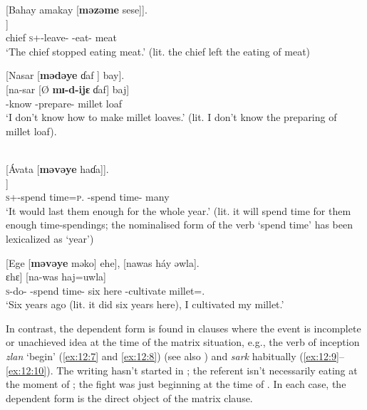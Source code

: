 \ea \label{ex:12:3}
[Bahay  amakay  [\textbf{məzəme}  sese]].\\
\gll  [bahaj   à-mak-aj   [Ø \textbf{mɪ-ʒʊm-ɛ}  ʃɛʃɛ]]\\
      chief  \textsc{s}+{\PFV}-leave-{\CL}  { }  {\NOM}-eat-{\CL}  meat\\
\glt  ‘The chief stopped eating meat.’ (lit. the chief left the eating of meat) 
\z 

\clearpage
\ea \label{ex:12:4}
[Nasar  [\textbf{mədəye}  ɗaf ]  bay].\\
\gll  {}[na-sar   [Ø \textbf{mɪ-d-ijɛ}      ɗaf]  baj]\\
      {\oneS}-know  { }  {\NOM}{}-prepare-{\CL}  {millet loaf}  {\NEG}\\
\glt  ‘I don’t know how to make millet loaves.’ (lit. I don’t know the preparing of millet loaf).
\z 

\ea \label{ex:12:5}
\\
{}[Ávata  [\textbf{məvəye}  haɗa]].\\
\gll  [á-v=ata     [\textbf{mɪ-v-ijɛ}    haɗa]]\\
      \textsc{s}+{\IFV}-{spend time}=\textsc{p}.{\IO}  {\NOM}{}-{spend time}-{\CL}  many\\
\glt  ‘It would last them enough for the whole year.’  (lit. it will {spend time} for them enough time-spendings; the nominalised form of the verb ‘{spend time}’ has been lexicalized as ‘year’)
\z 

\ea \label{ex:12:6}
[Ege  [\textbf{məvəye} məko]  ehe],  [nawas  háy  əwla].\\
\gll  [ɛ-g-ɛ  [\textbf{mɪ-v-ijɛ}  mʊkʷɔ]  ɛhɛ]  [na-was    haj=uwla]\\
      \textsc{s}-do-{\CL}  {\NOM}{}-{spend time}-{\CL}  six  here {\oneS}-cultivate  millet={\oneS}.{\POSS}\\
\glt  ‘Six years ago (lit. it did six years here), I cultivated my millet.’ 
\z 

In contrast, the dependent form is found in clauses where the event is incomplete or unachieved idea at the time of the matrix situation, e.g., the verb of inception \textit{zlan} ‘begin’ (\ref{ex:12:7} and \ref{ex:12:8}) (see also ) and \textit{sark} habitually (\ref{ex:12:9}--\ref{ex:12:10}). The writing hasn’t started in ; the referent isn’t necessarily eating at the moment of ; the fight was just beginning at the time of . In each case, the dependent form is the direct object of the matrix clause.

